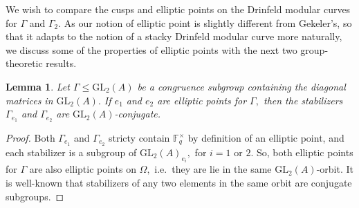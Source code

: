 \documentclass[11pt]{amsart}
\newtheorem{lemma}[theorem]{Lemma}
\theoremstyle{definition}
\numberwithin{equation}{section}
\newcommand{\GL}{\mathrm{GL}} 	%
\newcommand{\bbF}{\mathbb{F}}		%
\begin{document}
		We wish to compare the cusps and elliptic points on the Drinfeld modular curves for $\Gamma$ and $\Gamma_2.$ As our notion of elliptic point is slightly different from Gekeler's, so that it adapts to the notion of a stacky Drinfeld modular curve more naturally, we discuss some of the properties of elliptic points with the next two group-theoretic results. 
		\begin{lemma}\label{l: stabilizers are conjugate}
				Let $\Gamma\leq \GL_2(A)$ be a congruence subgroup containing the diagonal matrices in $\GL_2(A).$
				If $e_1$ and $e_2$ are elliptic points for $\Gamma,$ then the stabilizers $\Gamma_{e_1}$ and $\Gamma_{e_2}$ are $\GL_2(A)$-conjugate. 
		\end{lemma}
		\begin{proof}
			Both $\Gamma_{e_1}$ and $\Gamma_{e_2}$ stricty contain $\bbF_q^{\times}$ by definition of an elliptic point, and each stabilizer is a subgroup of $\GL_2(A)_{e_i},$ for $i=1$ or $2.$ So, both elliptic points for $\Gamma$ are also elliptic points on $\Omega,$ i.e.\ they are lie in the same $\GL_2(A)$-orbit. It is well-known that stabilizers of any two elements in the same orbit are conjugate subgroups.
		\end{proof}
		
\end{document}
